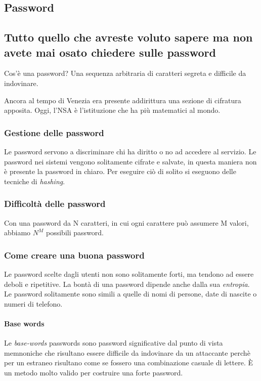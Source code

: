 \subsection{Password}

\subsection{Tutto quello che avreste voluto sapere ma non avete mai osato 
chiedere sulle password}

Cos'è una password? Una sequenza arbitraria di caratteri segreta e difficile da 
indovinare.

Ancora al tempo di Venezia era presente addirittura una sezione di cifratura 
apposita. Oggi, l'NSA è l'istituzione che ha più matematici al mondo.

\subsubsection{Gestione delle password}

Le password servono a discriminare chi ha diritto o no ad accedere al servizio.
Le password nei sistemi vengono solitamente cifrate e salvate, in questa 
maniera non è presente la password in chiaro. Per eseguire ciò di solito si 
eseguono delle tecniche di \textit{hashing}.

\subsubsection{Difficoltà delle password}

Con una password da N caratteri, in cui ogni carattere può assumere M valori, 
abbiamo $N^M$ possibili password.

\subsubsection{Come creare una buona password}

Le password scelte dagli utenti non sono solitamente forti, ma tendono ad 
essere deboli e ripetitive. La bontà di una password dipende anche dalla sua 
\textit{entropia}.
Le password solitamente sono simili a quelle di nomi di persone, date di 
nascite o numeri di telefono.

\paragraph*{Base words}
Le \textit{base-words} passwords sono password significative dal punto di vista 
memnoniche che risultano essere difficile da indovinare da un attaccante perchè 
per un estraneo risultano come se fossero una combinazione casuale di lettere. 
È un metodo molto valido per costruire una forte password.

